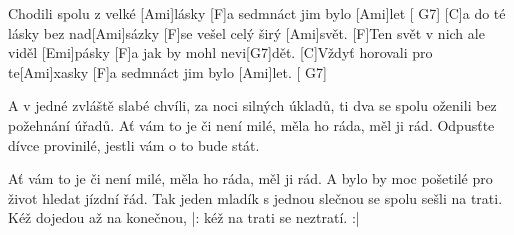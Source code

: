 
\sloka
[C]Chodili spolu z velké [Ami]lásky [F]a sedmnáct jim bylo [Ami]let [ G7]
[C]a do té lásky bez nad[Ami]sázky [F]se vešel celý širý [Ami]svět.
[F]Ten svět v nich ale viděl [Emi]pásky [F]a jak by mohl nevi[G7]dět.
[C]Vždyť horovali pro te[Ami]xasky [F]a sedmnáct jim bylo [Ami]let. [ G7]

\sloka
A v jedné zvláště slabé chvíli, za noci silných úkladů,
ti dva se spolu oženili bez požehnání úřadů.
Ať vám to je či není milé, měla ho ráda, měl ji rád.
Odpusťte dívce provinilé, jestli vám o to bude stát.

\sloka
Ať vám to je či není milé, měla ho ráda, měl ji rád.
A bylo by moc pošetilé pro život hledat jízdní řád.
Tak jeden mladík s jednou slečnou se spolu sešli na trati.
Kéž dojedou až na konečnou, |: kéž na trati se neztratí. :|
